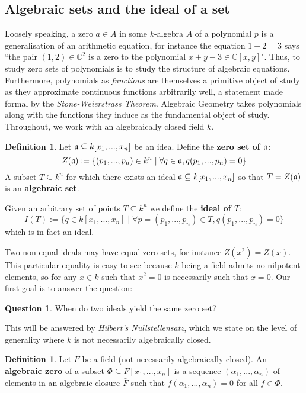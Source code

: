 \documentclass[12pt]{article}
\theoremstyle{plain}
\theoremstyle{definition}
\newtheorem{defn}[thm]{Definition} %
\newtheorem{question}[thm]{Question}
\newcommand{\bb}[1]{\mathbb{#1}}
\begin{document}
\subsection{Algebraic sets and the ideal of a set}
Loosely speaking, a zero $a \in A$ in some $k$-algebra $A$ of a polynomial $p$ is a generalisation of an arithmetic equation, for instance the equation $1 + 2 = 3$ says ``the pair $(1,2) \in \bb{C}^2$ is a zero to the polynomial $x + y - 3 \in \bb{C}[x,y]$". Thus, to study zero sets of polynomials is to study the structure of algebraic equations. Furthermore, polynomials as \emph{functions} are themselves a primitive object of study as they approximate continuous functions arbitrarily well, a statement made formal by the \emph{Stone-Weierstrass Theorem}. Algebraic Geometry takes polynomials along with the functions they induce as the fundamental object of study. Throughout, we work with an algebraically closed field $k$.
\begin{defn}
Let $\frak{a} \subseteq k[x_1,...,x_n]$ be an idea. Define the \textbf{zero set of $\frak{a}$}:
\begin{equation}
    Z(\frak{a}) := \lbrace (p_1,...,p_n) \in k^n \mid \forall q \in \frak{a}, q(p_1,...,p_n) = 0\rbrace
\end{equation}
A subset $T \subseteq k^n$ for which there exists an ideal $\frak{a} \subseteq k[x_1,...,x_n]$ so that $T = Z(\frak{a})$ is an \textbf{algebraic set}.

Given an arbitrary set of points $T \subseteq k^n$ we define the \textbf{ideal of $T$}:
\begin{equation}
    I(T) := \lbrace q \in k[x_1,...,x_n] \mid \forall p = (p_1,...,p_n) \in T, q(p_1,...,p_n) = 0 \rbrace
\end{equation}
which is in fact an ideal.
\end{defn}
Two non-equal ideals may have equal zero sets, for instance $Z(x^2) = Z(x)$. This particular equality is easy to see because $k$ being a field admits no nilpotent elements, so for any $x \in k$ such that $x^2 = 0$ is necessarily such that $x = 0$. Our first goal is to answer the question:
\begin{question}\label{question:zero_set}
When do two ideals yield the same zero set?
\end{question}
This will be answered by \emph{Hilbert's Nullstellensatz}, which we state on the level of generality where $k$ is not necessarily algebraically closed.
\begin{defn}
\label{def:algzero}
Let $F$ be a field (not necessarily algebraically closed). An \textbf{algebraic zero} of a subset $\Phi \subseteq F[x_1,...,x_n]$ is a sequence $(\alpha_1,...,\alpha_n)$ of elements in an algebraic closure $\bar{F}$ such that $f(\alpha_1,...,\alpha_n) = 0$ for all $f \in \Phi$.
\end{defn}
\end{document}
